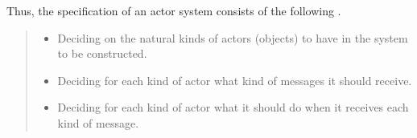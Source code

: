 
Thus, the specification of an actor system consists of the following \citep{Hewitt1977a}.

\begin{quote}
\begin{itemize}
  \item Deciding on the natural kinds of actors (objects) to have in the system to be constructed.
  \item Deciding for each kind of actor what kind of messages it should receive.
  \item Deciding for each kind of actor what it should do when it receives each kind of message.
\end{itemize}
\end{quote}

%

